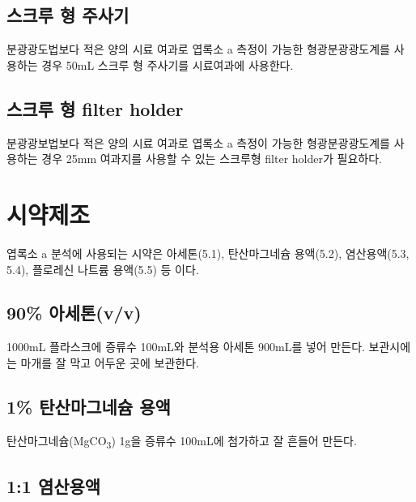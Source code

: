 \documentclass[
]{book}
\begin{document}
\hypertarget{uxc2a4uxd06cuxb8e8-uxd615-uxc8fcuxc0acuxae30}{%
\subsection{스크루 형 주사기}\label{uxc2a4uxd06cuxb8e8-uxd615-uxc8fcuxc0acuxae30}}

분광광도법보다 적은 양의 시료 여과로 엽록소 a 측정이 가능한 형광분광광도계를 사용하는 경우 50mL 스크루 형 주사기를 시료여과에 사용한다.

\hypertarget{uxc2a4uxd06cuxb8e8-uxd615-filter-holder}{%
\subsection{스크루 형 filter holder}\label{uxc2a4uxd06cuxb8e8-uxd615-filter-holder}}

분광광보법보다 적은 양의 시료 여과로 엽록소 a 측정이 가능한 형광분광광도계를 사용하는 경우 25mm 여과지를 사용할 수 있는 스크루형 filter holder가 필요하다.

\hypertarget{uxc2dcuxc57duxc81cuxc870-4}{%
\section{시약제조}\label{uxc2dcuxc57duxc81cuxc870-4}}

엽록소 a 분석에 사용되는 시약은 아세톤(5.1), 탄산마그네슘 용액(5.2), 염산용액(5.3, 5.4), 플로레신 나트륨 용액(5.5) 등 이다.

\hypertarget{uxc544uxc138uxd1a4vv}{%
\subsection{90\% 아세톤(v/v)}\label{uxc544uxc138uxd1a4vv}}

1000mL 플라스크에 증류수 100mL와 분석용 아세톤 900mL를 넣어 만든다. 보관시에는 마개를 잘 막고 어두운 곳에 보관한다.

\hypertarget{uxd0c4uxc0b0uxb9c8uxadf8uxb124uxc298-uxc6a9uxc561}{%
\subsection{1\% 탄산마그네슘 용액}\label{uxd0c4uxc0b0uxb9c8uxadf8uxb124uxc298-uxc6a9uxc561}}

탄산마그네슘(MgCO\textsubscript{3}) 1g을 증류수 100mL에 첨가하고 잘 흔들어 만든다.

\hypertarget{uxc5fcuxc0b0uxc6a9uxc561}{%
\subsection{1:1 염산용액}\label{uxc5fcuxc0b0uxc6a9uxc561}}
\end{document}
